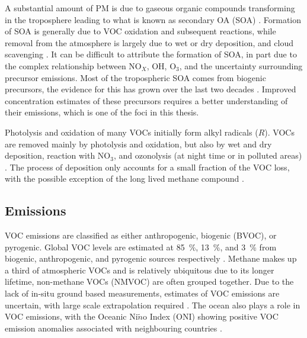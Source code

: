   A substantial amount of PM is due to gaseous organic compounds transforming in the troposphere leading to what is known as secondary OA (SOA) \parencite{Kroll2008}.
  Formation of SOA is generally due to VOC oxidation and subsequent reactions, while removal from the atmosphere is largely due to wet or dry deposition, and cloud scavenging \parencite{Kanakidou2005}.
  It can be difficult to attribute the formation of SOA, in part due to the complex relationship between NO$_X$, OH, O$_3$, and the uncertainty surrounding precursor emissions.
  Most of the tropospheric SOA comes from biogenic precursors, the evidence for this has grown over the last two decades \parencite{Guenther1995, Kanakidou2005,Guenther2012}.
  Improved concentration estimates of these precursors requires a better understanding of their emissions, which is one of the foci in this thesis.
  
  Photolysis and oxidation of many VOCs initially form alkyl radicals ($R\dot{}$).
  VOCs are removed mainly by photolysis and oxidation, but also by wet and dry deposition, reaction with NO$_3$, and ozonolysis (at night time or in polluted areas) \parencite{AtkinsonArey2003, Brown2009}.
  The process of deposition only accounts for a small fraction of the VOC loss, with the possible exception of the long lived methane compound \parencite{AtkinsonArey2003}.
  
  
  \subsection{Emissions}
    \label{LR:VOCs:Emissions}
    
    VOC emissions are classified as either anthropogenic, biogenic (BVOC), or pyrogenic.
    Global VOC levels are estimated at 85~\%, 13~\%, and 3~\% from biogenic, anthropogenic, and pyrogenic sources respectively \parencite{Kanakidou2005, Kefauver2014}.
    Methane makes up a third of atmospheric VOCs and is relatively ubiquitous due to its longer lifetime, non-methane VOCs (NMVOC) are often grouped together.
    Due to the lack of in-situ ground based measurements, estimates of VOC emissions are uncertain, with large scale extrapolation required \parencite{Millet2006}.
    The ocean also plays a role in VOC emissions, with the Oceanic Ni$\tilde{n}$o Index (ONI) showing positive VOC emission anomalies associated with neighbouring countries \parencite{Stavrakou2014}.
    
